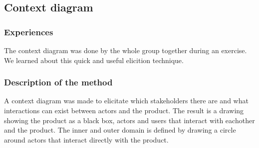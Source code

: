 


\subsection{Context diagram}

\subsubsection{Experiences}
The context diagram was done by the whole group together during an exercise. We learned about this quick and useful elicition technique.
\subsubsection{Description of the method}
A context diagram was made to elicitate which stakeholders there are and what interactions can exist between actors and the product. The result is a drawing showing the product as a black box, actors and users that interact with eachother and the product. The inner and outer domain is defined by drawing a circle around actors that interact directly with the product.
